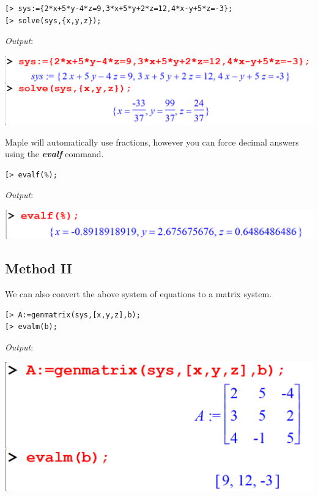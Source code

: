 \documentclass[
]{book}
\theoremstyle{definition}
\theoremstyle{definition}
\theoremstyle{definition}
\theoremstyle{definition}
\theoremstyle{remark}
\begin{document}
\begin{verbatim}
[> sys:={2*x+5*y-4*z=9,3*x+5*y+2*z=12,4*x-y+5*z=-3};
[> solve(sys,{x,y,z});
\end{verbatim}

\emph{Output}:

\includegraphics{figures/Lesson 5/fig4.png}

Maple will automatically use fractions, however you can force decimal answers using the \textbf{\emph{evalf}} command.

\begin{verbatim}
[> evalf(%);
\end{verbatim}

\emph{Output}:

\includegraphics{figures/Lesson 5/fig5.png}

\subsection{Method II}\label{method-ii}

We can also convert the above system of equations to a matrix system.

\begin{verbatim}
[> A:=genmatrix(sys,[x,y,z],b);
[> evalm(b);
\end{verbatim}

\emph{Output}:

\includegraphics{figures/Lesson 5/fig6.png}
\end{document}

